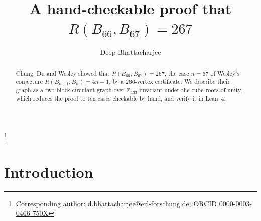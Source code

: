 \documentclass[11pt]{amsart}
\theoremstyle{definition}
\theoremstyle{remark}
\numberwithin{equation}{section}
\newcommand{\Z}{\mathbb{Z}}
\begin{document}
\title[A hand-checkable proof that $R(B_{66},B_{67})=267$]{A hand-checkable proof that $R(B_{66},B_{67})=267$}

\author{Deep Bhattacharjee}
\address{Formerly, Electro-Gravitational Space Propulsion Laboratory (EGSPL),\newline Bhubaneswar, Odisha 751030, India}
\thanks{Corresponding author: \href{mailto:d.bhattacharjee@erl-forschung.de}{d.bhattacharjee@erl-forschung.de}; ORCID \href{https://orcid.org/0000-0003-0466-750X}{\mbox{0000-0003-0466-750X}}}


\begin{abstract}
Chung, Du and Wesley showed that $R(B_{66},B_{67})=267$, the case $n=67$ of Wesley's conjecture $R(B_{n-1},B_n)=4n-1$, by a $266$-vertex certificate. We describe their graph as a two-block circulant graph over $\Z_{133}$ invariant under the cube roots of unity, which reduces the proof to ten cases checkable by hand, and verify it in Lean~4.
\end{abstract}

\maketitle

\section{Introduction}
\end{document}
